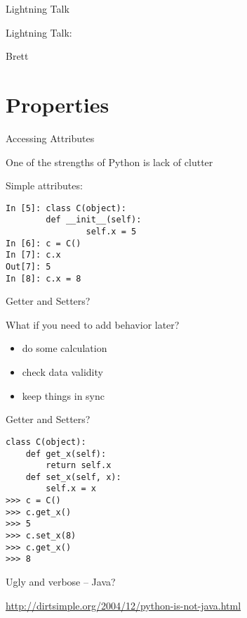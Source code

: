 \documentclass{beamer}
\begin{document}
\begin{frame}{Lightning Talk}

{\centering

\vfill
{\LARGE Lightning Talk:  }

\vfill
{\Huge Brett}

\vfill
}
\end{frame}

\section{Properties}

\begin{frame}[fragile]{Accessing Attributes}

{\Large One of the strengths of Python is lack of clutter}

\vfill
{\Large Simple attributes:}

\begin{verbatim}
In [5]: class C(object):
        def __init__(self):
                self.x = 5
In [6]: c = C()
In [7]: c.x
Out[7]: 5
In [8]: c.x = 8
\end{verbatim}

\end{frame} 

\begin{frame}[fragile]{Getter and Setters?}

{\Large What if you need to add behavior later?}

\begin{itemize}
  \item do some calculation
  \item check data validity
  \item keep things in sync
\end{itemize}

\end{frame}


\begin{frame}[fragile]{Getter and Setters?}

\begin{verbatim}
class C(object):
    def get_x(self):
        return self.x
    def set_x(self, x):
        self.x = x
>>> c = C()
>>> c.get_x()
>>> 5
>>> c.set_x(8)
>>> c.get_x()
>>> 8
\end{verbatim}
{\Large Ugly and verbose -- Java?}

\url{http://dirtsimple.org/2004/12/python-is-not-java.html}

\end{frame} 
\end{document}
